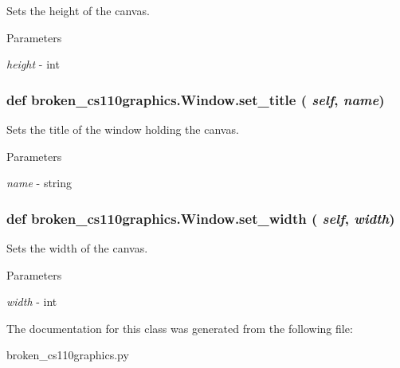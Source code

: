 Sets the height of the canvas. 
\begin{DoxyParams}{Parameters}
\item[{\em height}]-\/ int \end{DoxyParams}
\hypertarget{classbroken__cs110graphics_1_1Window_af6004f9865cc8c168cc5e0959ba04050}{
\subsubsection[{set\_\-title}]{\setlength{\rightskip}{0pt plus 5cm}def broken\_\-cs110graphics.Window.set\_\-title ( {\em self}, \/   {\em name})}}
\label{classbroken__cs110graphics_1_1Window_af6004f9865cc8c168cc5e0959ba04050}


Sets the title of the window holding the canvas. 
\begin{DoxyParams}{Parameters}
\item[{\em name}]-\/ string \end{DoxyParams}
\hypertarget{classbroken__cs110graphics_1_1Window_ab84dc19bc3658479e4b2386003f08570}{
\subsubsection[{set\_\-width}]{\setlength{\rightskip}{0pt plus 5cm}def broken\_\-cs110graphics.Window.set\_\-width ( {\em self}, \/   {\em width})}}
\label{classbroken__cs110graphics_1_1Window_ab84dc19bc3658479e4b2386003f08570}


Sets the width of the canvas. 
\begin{DoxyParams}{Parameters}
\item[{\em width}]-\/ int \end{DoxyParams}


The documentation for this class was generated from the following file:\begin{DoxyCompactItemize}
\item 
broken\_\-cs110graphics.py\end{DoxyCompactItemize}
